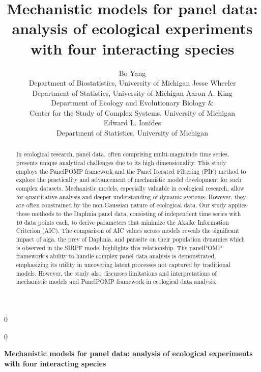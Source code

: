 \documentclass[12pt]{article}
\newcommand{\blind}{0}
\begin{document}

\def\spacingset#1{\renewcommand{\baselinestretch}%
{#1}\small\normalsize} \spacingset{1}


\blind
{
  \title{\bf Mechanistic models for panel data: analysis of ecological experiments with four interacting species}
\author{Bo Yang\\Department of Biostatistics, University of Michigan \And
        Jesse Wheeler\\Department of Statistics, University of Michigan \And
        Aaron A. King\\Department of Ecology and Evolutionary Biology \& \\ Center for the Study of Complex Systems, University of Michigan\\\And
        Edward L. Ionides\\Department of Statistics, University of Michigan}
  \maketitle
} \fi


\blind
{
  \bigskip
  \bigskip
  \bigskip
  \begin{center}
    {\LARGE\bf Mechanistic models for panel data: analysis of ecological experiments with four interacting species}
\end{center}
  \medskip
} \fi




\bigskip
\begin{abstract}
In ecological research, panel data, often comprising multi-magnitude time series, presents unique analytical challenges due to its high dimensionality. This study employs the PanelPOMP framework and the Panel Iterated Filtering (PIF) method to explore the practicality and advancement of mechanistic model development for such complex datasets. Mechanistic models, especially valuable in ecological research, allow for quantitative analysis and deeper understanding of dynamic systems. However, they are often constrained by the non-Gaussian nature of ecological data. Our study applies these methods to the Daphnia panel data, consisting of independent time series with 10 data points each, to derive parameters that minimize the Akaike Information Criterion (AIC). The comparison of AIC values across models reveals the significant impact of alga, the prey of Daphnia, and parasite on their population dynamics which is observed in the SIRPF model highlights this relationship. The panelPOMP framework's ability to handle complex panel data analysis is demonstrated, emphasizing its utility in uncovering latent processes not captured by traditional models. However, the study also discusses limitations and interpretations of mechanistic models and PanelPOMP framework in ecological data analysis.
\end{abstract}
\end{document}
